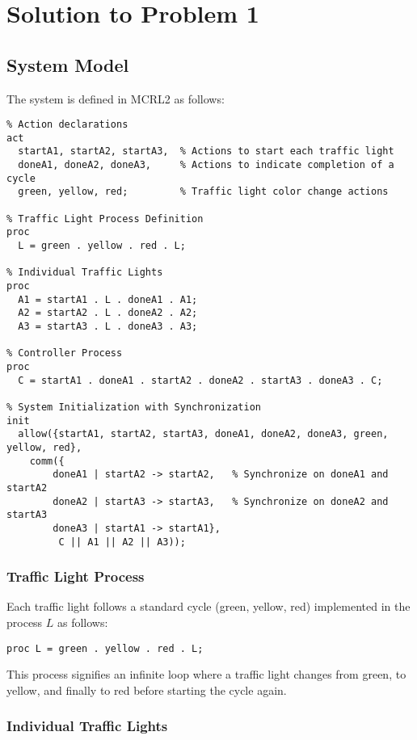 \documentclass{article}
\begin{document}
\newpage

\section*{Solution to Problem 1}
\subsection{System Model}

The system is defined in MCRL2 as follows:

\begin{verbatim}
% Action declarations
act
  startA1, startA2, startA3,  % Actions to start each traffic light
  doneA1, doneA2, doneA3,     % Actions to indicate completion of a cycle
  green, yellow, red;         % Traffic light color change actions

% Traffic Light Process Definition
proc
  L = green . yellow . red . L;

% Individual Traffic Lights
proc
  A1 = startA1 . L . doneA1 . A1;
  A2 = startA2 . L . doneA2 . A2;
  A3 = startA3 . L . doneA3 . A3;

% Controller Process
proc
  C = startA1 . doneA1 . startA2 . doneA2 . startA3 . doneA3 . C;

% System Initialization with Synchronization
init
  allow({startA1, startA2, startA3, doneA1, doneA2, doneA3, green, yellow, red},
	comm({
  		doneA1 | startA2 -> startA2,   % Synchronize on doneA1 and startA2
  		doneA2 | startA3 -> startA3,   % Synchronize on doneA2 and startA3
  		doneA3 | startA1 -> startA1},
         C || A1 || A2 || A3));
\end{verbatim}

\subsubsection{Traffic Light Process}

Each traffic light follows a standard cycle (green, yellow, red) implemented in the process \( L \) as follows:
\begin{lstlisting}
proc L = green . yellow . red . L;
\end{lstlisting}

This process signifies an infinite loop where a traffic light changes from green, to yellow, and finally to red before starting the cycle again.

\subsubsection{Individual Traffic Lights}
\end{document}
